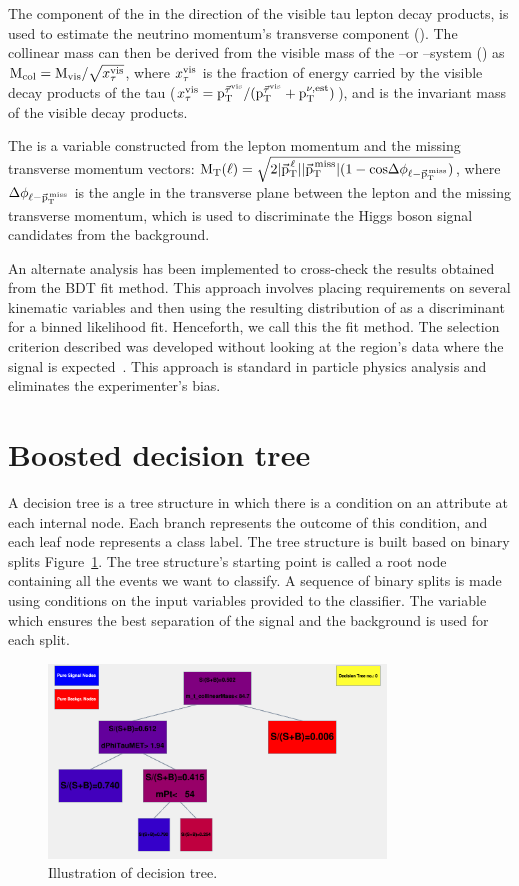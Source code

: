 The component of the \ptvecmiss in the direction of the visible tau lepton decay products, is used to estimate the neutrino momentum's transverse component (\ptnu). The collinear mass can then be derived from the visible mass of the \Pgm--\Pgt or \Pe--\Pgt system (\mvis) as $\text{M}_{\text{col}} = \text{M}_{\text{vis}}/\sqrt{x_\tau^{\text{vis}}}$, where $x_\tau^{\text{vis}}$ is the fraction of energy carried by the visible decay products of the tau ($x_\tau^{\text{vis}} = \text{p}_\text{T}^{\vec{\tau}^{\text{vis}}}/(\text{p}_\text{T}^{\vec{\tau}^{\text{vis}}} + \text{p}_\text{T}^{\nu,\text{est}})$), and \mvis is the invariant mass of the visible decay products.

The \mtl is a variable constructed from the lepton momentum and the missing transverse momentum vectors: $\text{M}_\mathrm{T}(\ell) = \sqrt{2\lvert{\vec{\text{p}}}_{\mathrm{T}}^{\kern1pt\ell}\rvert\lvert{\vec{\text{p}}}_{\mathrm{T}}^{\kern1pt\text{miss}}\rvert (1-\text{cos}\Delta\phi_{\ell-{\vec{\text{p}}}_{\mathrm{T}}^{\kern1pt\text{miss}}})}$, where $\Delta\phi_{\ell-{\vec{\text{p}}}_{\mathrm{T}}^{\kern1pt\text{miss}}}$ is the angle in the transverse plane between the lepton and the missing transverse momentum, which is used to discriminate the Higgs boson signal candidates from the \wjets background.

An alternate analysis has been implemented to cross-check the results obtained from the BDT fit method. This approach involves placing requirements on several kinematic variables and then using the resulting distribution of \mcol as a discriminant for a binned likelihood fit. Henceforth, we call this the \mcol fit method. The selection criterion described was developed without looking at the region's data where the signal is expected~\cite{Roodman:2003rw}. This approach is standard in particle physics analysis and eliminates the experimenter's bias.

\section{Boosted decision tree}
\label{bdt}
A decision tree is a tree structure in which there is a condition on an attribute at each internal node. Each branch represents the outcome of this condition, and each leaf node represents a class label. The tree structure is built based on binary splits Figure~\ref{fig:dec_tree}. The tree structure's starting point is called a root node containing all the events we want to classify. A sequence of binary splits is made using conditions on the input variables provided to the classifier. The variable which ensures the best separation of the signal and the background is used for each split.

\begin{figure}[htbp]
  \centering
  \includegraphics[width=0.8\textwidth]{plots/chapter6/BDT/BDT.png}
  \caption{Illustration of decision tree.}
  \label{fig:dec_tree}
\end{figure}

